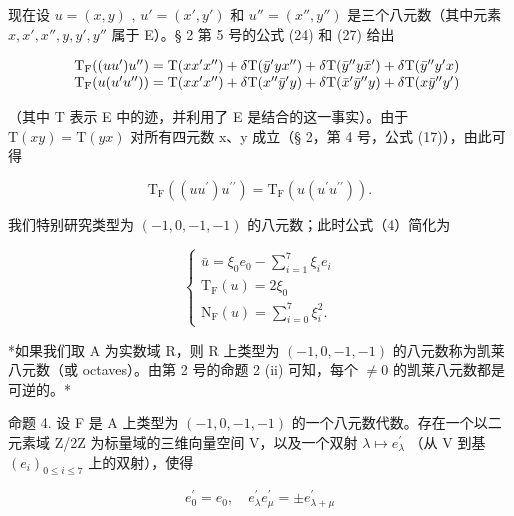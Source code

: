 现在设 \(u = (x, y)\) , \(u' = (x', y')\) 和 \(u'' = (x'', y'')\) 是三个八元数（其中元素 \(x, x', x'', y, y', y''\) 属于 E）。§ 2 第 5 号的公式 (24) 和 (27) 给出

\[
\begin{array}{r l} & {\mathrm{T} _ {\mathrm{F}} ((u u ^ {\prime}) u ^ {\prime \prime}) = \mathrm{T} (x x ^ {\prime} x ^ {\prime \prime}) + \delta \mathrm{T} (\bar {y} ^ {\prime} y x ^ {\prime \prime}) + \delta \mathrm{T} (\bar {y} ^ {\prime \prime} y \bar {x} ^ {\prime}) + \delta \mathrm{T} (\bar {y} ^ {\prime \prime} y ^ {\prime} x)} \\ & {\mathrm{T} _ {\mathrm{F}} (u (u ^ {\prime} u ^ {\prime \prime})) = \mathrm{T} (x x ^ {\prime} x ^ {\prime \prime}) + \delta \mathrm{T} (x ^ {\prime \prime} \bar {y} ^ {\prime} y) + \delta \mathrm{T} (\bar {x} ^ {\prime} \bar {y} ^ {\prime \prime} y) + \delta \mathrm{T} (x \bar {y} ^ {\prime \prime} y ^ {\prime})} \end{array}
\]

（其中 T 表示 E 中的迹，并利用了 E 是结合的这一事实）。由于 \(\mathrm{T}(xy) = \mathrm{T}(yx)\) 对所有四元数 x、y 成立（§ 2，第 4 号，公式 (17)），由此可得

\[
\mathrm{T} _ {\mathrm{F}} ((u u ^ {\prime}) u ^ {\prime \prime}) = \mathrm{T} _ {\mathrm{F}} (u (u ^ {\prime} u ^ {\prime \prime})).\tag{5}
\]

我们特别研究类型为 \((-1, 0, -1, -1)\) 的八元数；此时公式（4）简化为

\[
\left\{ \begin{array}{c} {\bar {u}} = \xi_ {0} e _ {0} - \sum_ {i = 1} ^ {7} \xi_ {i} e _ {i} \\ \mathrm{T} _ {\mathrm{F}} (u) = 2 \xi_ {0} \\ \mathrm{N} _ {\mathrm{F}} (u) = \sum_ {i = 0} ^ {7} \xi_ {i} ^ {2}. \end{array} \right.\tag{6}
\]

*如果我们取 A 为实数域 R，则 R 上类型为 \((-1,0,-1,-1)\) 的八元数称为凯莱八元数（或 octaves）。由第 2 号的命题 2 (ii) 可知，每个 \(\neq0\) 的凯莱八元数都是可逆的。*

命题 4. 设 F 是 A 上类型为 \((-1,0,-1,-1)\) 的一个八元数代数。存在一个以二元素域 Z/2Z 为标量域的三维向量空间 V，以及一个双射 \(\lambda\mapsto e_{\lambda}^{\prime}\) （从 V 到基 \((e_{i})_{0\leq i\leq7}\) 上的双射），使得

\[
e _ {0} ^ {\prime} = e _ {0}, \quad e _ {\lambda} ^ {\prime} e _ {\mu} ^ {\prime} = \pm e _ {\lambda + \mu} ^ {\prime}\tag{7}
\]


